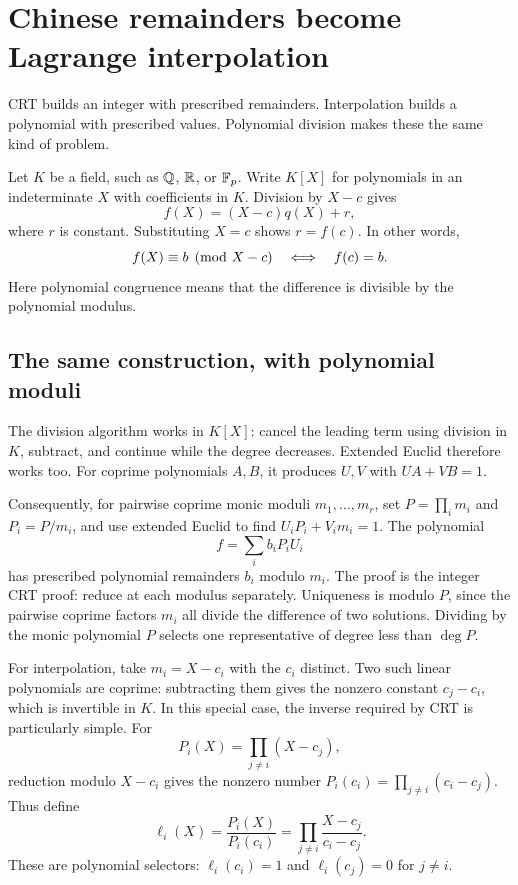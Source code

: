 \section{Chinese remainders become Lagrange interpolation}
\label{sec:crt-interpolation}

CRT builds an integer with prescribed remainders. Interpolation builds
a polynomial with prescribed values. Polynomial division makes these
the same kind of problem.

Let $K$ be a field, such as $\mathbb Q$, $\mathbb R$, or $\mathbb F_p$. Write $K[X]$ for
polynomials in an indeterminate $X$ with coefficients in $K$. Division
by $X-c$ gives
\[
 f(X)=(X-c)q(X)+r,
\]
where $r$ is constant. Substituting $X=c$ shows $r=f(c)$. In other words,
\[
 f(X)\equiv b\pmod{X-c}\quad\Longleftrightarrow\quad f(c)=b.
\]
Here polynomial congruence means that the difference is divisible by the
polynomial modulus.

\subsection*{The same construction, with polynomial moduli}

The division algorithm works in $K[X]$: cancel the leading term using
division in $K$, subtract, and continue while the degree decreases.
Extended Euclid therefore works too. For coprime polynomials $A,B$,
it produces $U,V$ with $UA+VB=1$.

Consequently, for pairwise coprime monic moduli $m_1,\ldots,m_r$, set
$P=\prod_i m_i$ and $P_i=P/m_i$, and use extended Euclid to find
$U_iP_i+V_im_i=1$. The polynomial
\[
 f=\sum_i b_iP_iU_i
\]
has prescribed polynomial remainders $b_i$ modulo $m_i$.
The proof is the integer CRT proof: reduce at each modulus separately.
Uniqueness is modulo $P$, since the pairwise coprime factors $m_i$ all
divide the difference of two solutions. Dividing by the monic polynomial
$P$ selects one representative of degree less than $\deg P$.

For interpolation, take $m_i=X-c_i$ with the $c_i$ distinct. Two such
linear polynomials are coprime: subtracting them gives the nonzero
constant $c_j-c_i$, which is invertible in $K$.
In this special case, the inverse required by CRT is particularly simple.
For
\[
 P_i(X)=\prod_{j\ne i}(X-c_j),
\]
reduction modulo $X-c_i$ gives the nonzero number
$P_i(c_i)=\prod_{j\ne i}(c_i-c_j)$.
Thus define
\[
 \ell_i(X)=\frac{P_i(X)}{P_i(c_i)}
 =\prod_{j\ne i}\frac{X-c_j}{c_i-c_j}.
\]
These are polynomial selectors: $\ell_i(c_i)=1$ and
$\ell_i(c_j)=0$ for $j\ne i$.

